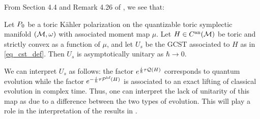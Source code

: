 \documentclass[notas.tex]{subfiles}
\begin{document}
From Section 4.4 and Remark 4.26 of \cite{kirwin_complex_2013}, we see that:
\begin{thm} \label{thm_gcst_asymp_unitarity}
	Let $P_0$ be a toric Kähler polarization on the quantizable toric symplectic manifold $(\mathcal{M}, \omega)$ with associated moment map $\mu$. Let $H \in C^{\text{an}}(\mathcal{M})$ be toric and strictly convex as a function of $\mu$, and let $U_s$ be the GCST associated to $H$ as in \eqref{eq_cst_def}. Then $U_{s}$ is asymptotically unitary as $\hbar \to 0$.
\end{thm}
\begin{rem} \label{rem_gcst_interpretation}
	We can interpret $U_s$ as follows: the factor $e^{\frac{i}{\hbar} \tau \mathcal{Q}(H)}$ corresponds to quantum evolution while the factor $e^{-\frac{i}{\hbar} \tau \mathcal{\mathcal{P}^\text{hf}}(H)}$ is associated to an exact lifting of classical evolution in complex time. Thus, one can interpret the lack of unitarity of this map as due to a difference between the two types of evolution. This will play a role in the interpretation of the results in .
\end{rem}




\end{document}
